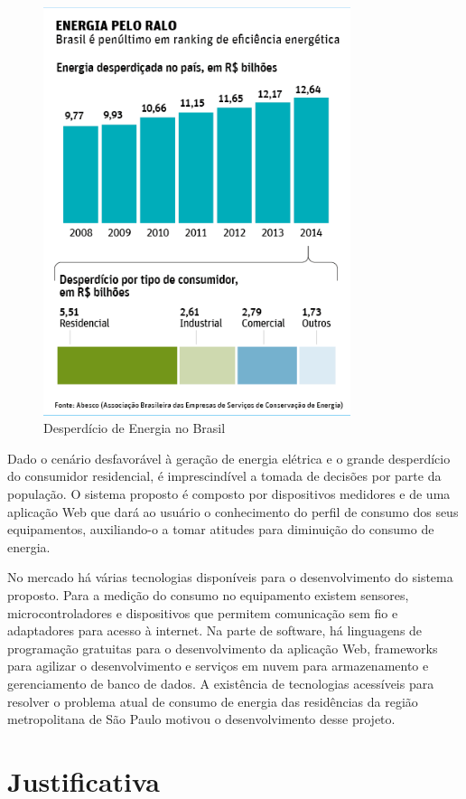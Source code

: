 \begin{figure}
\centering
\includegraphics[width=9cm,keepaspectratio]{figuras/desperdicio.jpg}
\caption{\label{fig:desperdicio} Desperdício de Energia no Brasil}
\end{figure}

Dado o cenário desfavorável à geração de energia elétrica e o grande desperdício do consumidor residencial, é imprescindível a tomada de decisões por parte da população. O sistema proposto é composto por dispositivos medidores e de uma aplicação Web que dará ao usuário o conhecimento do perfil de consumo dos seus equipamentos, auxiliando-o a tomar atitudes para diminuição do consumo de energia.

No mercado há várias tecnologias disponíveis para o desenvolvimento do sistema proposto. Para a medição do consumo no equipamento existem sensores, microcontroladores e dispositivos que permitem comunicação sem fio e adaptadores para acesso à internet. Na parte de software, há linguagens de programação gratuitas para o desenvolvimento da aplicação Web, frameworks para agilizar o desenvolvimento e serviços em nuvem para armazenamento e gerenciamento de banco de dados. A existência de tecnologias acessíveis para resolver o problema atual de consumo de energia das residências da região metropolitana de São Paulo motivou o desenvolvimento desse projeto.

\section{Justificativa}
\label{Sec:justificativa}

